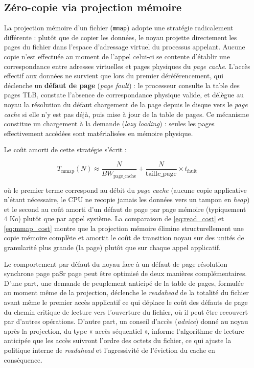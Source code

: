 \documentclass[12pt,a4paper]{report}
\begin{document}
\subsection{Zéro-copie via projection mémoire}

La projection mémoire d'un fichier (\texttt{mmap}) adopte une stratégie radicalement différente : plutôt que de copier les données, le noyau projette directement les pages du fichier dans l'espace d'adressage virtuel du processus appelant. Aucune copie n'est effectuée au moment de l'appel celui-ci se contente d'établir une correspondance entre adresses virtuelles et pages physiques du \textit{page cache}. L'accès effectif aux données ne survient que lors du premier déréférencement, qui déclenche un \textbf{défaut de page} (\textit{page fault}) : le processeur consulte la table des pages TLB, constate l'absence de correspondance physique valide, et délègue au noyau la résolution du défaut chargement de la page depuis le disque vers le \textit{page cache} si elle n'y est pas déjà, puis mise à jour de la table de pages. Ce mécanisme constitue un chargement à la demande (\textit{lazy loading}) : seules les pages effectivement accédées sont matérialisées en mémoire physique.

Le coût amorti de cette stratégie s'écrit :

\begin{equation}
\label{eq:mmap_cost}
T_{\text{mmap}}(N) \approx \frac{N}{BW_{\text{page\_cache}}} + \frac{N}{\text{taille\_page}} \times t_{\text{fault}}
\end{equation}

où le premier terme correspond au débit du \textit{page cache} (aucune copie applicative n'étant nécessaire, le CPU ne recopie jamais les données vers un tampon en \textit{heap}) et le second au coût amorti d'un défaut de page par page mémoire (typiquement 4 Ko) plutôt que par appel système. La comparaison de \eqref{eq:read_cost} et \eqref{eq:mmap_cost} montre que la projection mémoire élimine structurellement une copie mémoire complète et amortit le coût de transition noyau sur des unités de granularité plus grande (la page) plutôt que sur chaque appel applicatif.

Le comportement par défaut du noyau face à un défaut de page résolution synchrone page paSr page peut être optimisé de deux manières complémentaires. D'une part, une demande de peuplement anticipé de la table de pages, formulée au moment même de la projection, déclenche le \textit{readahead} de la totalité du fichier avant même le premier accès applicatif ce qui déplace le coût des défauts de page du chemin critique de lecture vers l'ouverture du fichier, où il peut être recouvert par d'autres opérations. D'autre part, un conseil d'accès (\textit{advice}) donné au noyau après la projection, du type « accès séquentiel », informe l'algorithme de lecture anticipée que les accès suivront l'ordre des octets du fichier, ce qui ajuste la politique interne de \textit{readahead} et l'agressivité de l'éviction du cache en conséquence.
\end{document}
